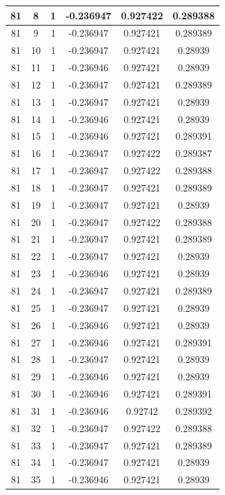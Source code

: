 \documentclass[12pt,a4paper]{article}
\numberwithin{equation}{section}
\numberwithin{figure}{section}
\numberwithin{table}{section}
\begin{document}
\begin{longtable}{|c|c|c|c|c|c|}
81 & 8 & 1 & -0.236947 & 0.927422 & 0.289388 \\ \hline
81 & 9 & 1 & -0.236947 & 0.927421 & 0.289389 \\ \hline
81 & 10 & 1 & -0.236947 & 0.927421 & 0.28939 \\ \hline
81 & 11 & 1 & -0.236946 & 0.927421 & 0.28939 \\ \hline
81 & 12 & 1 & -0.236947 & 0.927421 & 0.289389 \\ \hline
81 & 13 & 1 & -0.236947 & 0.927421 & 0.28939 \\ \hline
81 & 14 & 1 & -0.236946 & 0.927421 & 0.28939 \\ \hline
81 & 15 & 1 & -0.236946 & 0.927421 & 0.289391 \\ \hline
81 & 16 & 1 & -0.236947 & 0.927422 & 0.289387 \\ \hline
81 & 17 & 1 & -0.236947 & 0.927422 & 0.289388 \\ \hline
81 & 18 & 1 & -0.236947 & 0.927421 & 0.289389 \\ \hline
81 & 19 & 1 & -0.236947 & 0.927421 & 0.28939 \\ \hline
81 & 20 & 1 & -0.236947 & 0.927422 & 0.289388 \\ \hline
81 & 21 & 1 & -0.236947 & 0.927421 & 0.289389 \\ \hline
81 & 22 & 1 & -0.236947 & 0.927421 & 0.28939 \\ \hline
81 & 23 & 1 & -0.236946 & 0.927421 & 0.28939 \\ \hline
81 & 24 & 1 & -0.236947 & 0.927421 & 0.289389 \\ \hline
81 & 25 & 1 & -0.236947 & 0.927421 & 0.28939 \\ \hline
81 & 26 & 1 & -0.236946 & 0.927421 & 0.28939 \\ \hline
81 & 27 & 1 & -0.236946 & 0.927421 & 0.289391 \\ \hline
81 & 28 & 1 & -0.236947 & 0.927421 & 0.28939 \\ \hline
81 & 29 & 1 & -0.236946 & 0.927421 & 0.28939 \\ \hline
81 & 30 & 1 & -0.236946 & 0.927421 & 0.289391 \\ \hline
81 & 31 & 1 & -0.236946 & 0.92742 & 0.289392 \\ \hline
81 & 32 & 1 & -0.236947 & 0.927422 & 0.289388 \\ \hline
81 & 33 & 1 & -0.236947 & 0.927421 & 0.289389 \\ \hline
81 & 34 & 1 & -0.236947 & 0.927421 & 0.28939 \\ \hline
81 & 35 & 1 & -0.236946 & 0.927421 & 0.28939 \\ \hline

\end{longtable}
\end{document}
